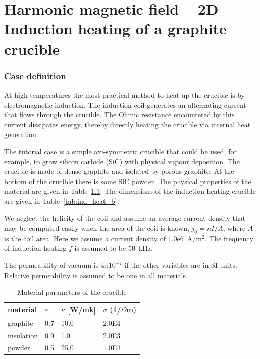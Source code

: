 \chapter{Harmonic magnetic field -- 2D -- Induction heating of a graphite crucible}



\subsection*{Case definition}

At high temperatures the most practical method to heat up the crucible 
is by electromagnetic induction.  The induction coil generates an alternating 
current that flows through the crucible. 
The Ohmic resistance encountered by this current dissipates 
energy, thereby directly heating the crucible via internal heat generation.

The tutorial case is a simple axi-symmetric crucible that could be
used, for example, to grow silicon carbide (SiC) with physical vapour deposition.
The crucible is made of dense graphite and isolated by 
porous graphite. At the bottom of the crucible there is
some SiC powder. The physical properties of the 
material are given in Table~\ref{tab:ind_heat_a}. The dimensions of the
induction heating crucible are given in Table~\ref{tab:ind_heat_b}.

We neglect the helicity of the coil and assume an  
average current density that may be computed easily when the 
area of the coil is known, $j_0=n I / A$, where $A$ is the coil area.
Here we assume a current density of 1.0e6~A/m$^2$. 
The frequency of induction heating $f$ is assumed to be 50~kHz.

The permeability of vacuum is $4\pi 10^{-7}$
if the other variables are in SI-units. Relative permeability is assumed to be one in all materials. 

\begin{table}
\caption{Material parameters of the crucible}
\label{tab:ind_heat_a}
\begin{center}
\begin{tabular}{llll} \hline
material & $\varepsilon$  & $\kappa$ [W/mk] & $\sigma$ (1/$\Omega$m) \\ \hline 
graphite  &      0.7   &          10.0  &          2.0E4 \\
insulation &      0.9   &          1.0   &          2.0E3  \\
powder    &      0.5   &          25.0  &          1.0E4 \\ \hline
\end{tabular}
\end{center}
\end{table}

